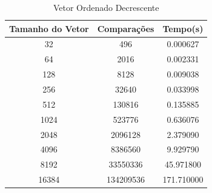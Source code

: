 \documentclass[12pt,a4paper,twoside]{report}
\begin{document}
\begin{table}[h]
  \centering
  \caption{Vetor Ordenado Decrescente \label{tab:od}}
  \begin{tabular}{ccc} \\\hline
  \textbf{Tamanho do Vetor} & \textbf{Comparações} & \textbf{Tempo(s)} \\\hline
  32                        & 496                  & 0.000627          \\\hline
  64                        & 2016                 & 0.002331          \\\hline
  128                       & 8128                 & 0.009038          \\\hline
  256                       & 32640                & 0.033998          \\\hline
  512                       & 130816               & 0.135885          \\\hline
  1024                      & 523776               & 0.636076          \\\hline
  2048                      & 2096128              & 2.379090          \\\hline
  4096                      & 8386560              & 9.929790         \\\hline
  8192                      & 33550336             & 45.971800        \\\hline
  16384                     & 134209536            & 171.710000        \\\hline
  \end{tabular}
\end{table}
\end{document}
